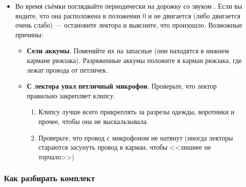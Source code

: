 \begin{itemize}
  \item Во время съёмки поглядвайте периодически на дорожку со звуком . Если вы видите, что она расположена в положении 0 и не двигается (либо двигается очень слабо) --- остановите лектора и выясните, что произошло. Возможные причины:
        \begin{itemize}
          \item \textbf{Сели аккумы}. Поменяйте их на запасные (они находятся в нижнем кармане рюкзака). Разряженные аккумы положите в карман рюкзака, где лежат провода от петличек.

          \item \textbf{С лектора упал петличный микрофон}. Проверьте, что лектор правильно закрепляет клипсу.
                \begin{enumerate}
                  \item Клипсу лучше всего прикреплять за разрезы одежды, воротники и прочее, чтобы она не выскальзывала.
                  \item Проверьте, что провод с микрофоном не натянут (иногда лекторы стараются засунуть провод в карман, чтобы <<лишнее не торчало>>)
                \end{enumerate}
        \end{itemize}
\end{itemize}

\subsubsection{Как разбирать комплект}

